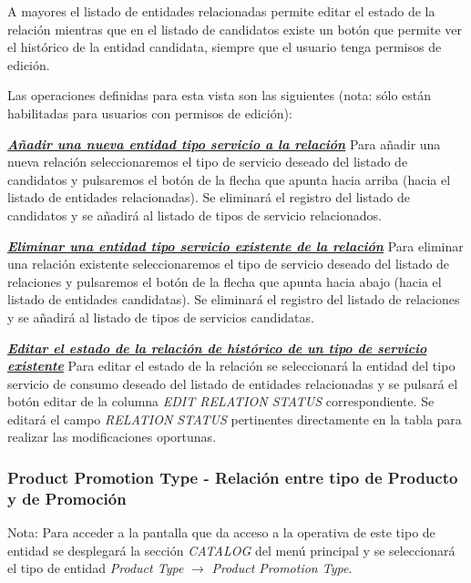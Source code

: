 A mayores el listado de entidades relacionadas permite editar el estado de la relación mientras que en el listado de candidatos existe un botón que permite ver el histórico de la entidad candidata, siempre que el usuario tenga permisos de edición.


Las operaciones definidas para esta vista son las siguientes (nota: sólo están habilitadas para usuarios con permisos de edición):

\underline{\textsl{\textbf{Añadir una nueva entidad tipo servicio a la relación}}} \newline
Para añadir una nueva relación seleccionaremos el tipo de servicio deseado del listado de candidatos y pulsaremos el botón de la flecha que apunta hacia arriba (hacia el listado de entidades relacionadas). Se eliminará el registro del listado de candidatos y se añadirá al listado de tipos de servicio relacionados.


\underline{\textsl{\textbf{Eliminar una entidad tipo servicio existente de la relación}}}\newline
Para eliminar una relación existente seleccionaremos el tipo de servicio deseado del listado de relaciones y pulsaremos el botón de la flecha que apunta hacia abajo (hacia el listado de entidades candidatas). Se eliminará el registro del listado de relaciones y se añadirá al listado de tipos de servicios candidatas.


\underline{\textsl{\textbf{Editar el estado de la relación de histórico de un tipo de servicio existente}}}
Para editar el estado de la relación se seleccionará la entidad del tipo servicio de consumo deseado del listado de entidades relacionadas y se pulsará el botón editar de la columna \textit{EDIT RELATION STATUS} correspondiente. Se editará el campo \emph{RELATION STATUS} pertinentes directamente en la tabla para realizar las modificaciones oportunas.




\subsubsection{Product Promotion Type - Relación entre tipo de Producto y de Promoción}
\label{sub:product-promotion-type-relation}

Nota: Para acceder a la pantalla que da acceso a la operativa de este tipo de entidad se desplegará la sección \emph{CATALOG} del menú principal y se seleccionará el tipo de entidad \emph{Product Type} $\rightarrow$  \emph{Product Promotion Type}.


